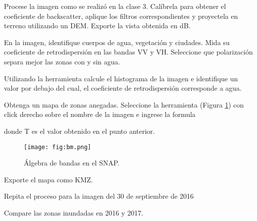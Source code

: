 \begin{que}
    Procese la imagen como se realizó en la clase 3. Calíbrela para obtener el coeficiente de backscatter, aplique los filtros correspondientes y proyectela en terreno utilizando un DEM. Exporte la vista obtenida en dB.
\end{que}

\begin{que}
    En la imagen, identifique cuerpos de agua, vegetación y ciudades. Mida su coeficiente de retrodispersión en las bandas VV y VH. Seleccione que polarización separa mejor las zonas con y sin agua.
\end{que}

\begin{que}
    Utilizando la herramienta  calcule el histograma de la imagen e identifique un valor por debajo del cual, el coeficiente de retrodispersión corresponde a agua.
\end{que}

\begin{que}
    Obtenga un mapa de zonas anegadas. Seleccione la herramienta  (Figura \ref{fig:bm}) con click derecho sobre el nombre de la imagen e ingrese la formula
    \begin{center}
    \end{center}
    donde T es el valor obtenido en el punto anterior.
    \begin{figure}[h!]
        \centering
        \texttt{[image: fig:bm.png]}
        \caption{Álgebra de bandas en el SNAP.}
        \label{fig:bm}
    \end{figure}
\end{que}

\begin{que}
    Exporte el mapa como KMZ.
\end{que}

\begin{que}
    Repita el proceso para la imagen del 30 de septiembre de 2016
    \begin{center}
    \end{center}
\end{que}

\begin{que}
    Compare las zonas inundadas en 2016 y 2017.
\end{que}
